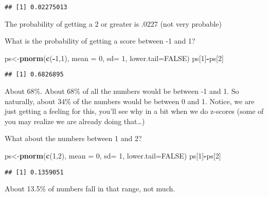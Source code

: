 \documentclass[
]{book}
\newenvironment{Shaded}{\begin{snugshade}}{\end{snugshade}}
\newcommand{\AttributeTok}[1]{\textcolor[rgb]{0.13,0.29,0.53}{#1}}
\newcommand{\ConstantTok}[1]{\textcolor[rgb]{0.56,0.35,0.01}{#1}}
\newcommand{\DecValTok}[1]{\textcolor[rgb]{0.00,0.00,0.81}{#1}}
\newcommand{\FunctionTok}[1]{\textcolor[rgb]{0.13,0.29,0.53}{\textbf{#1}}}
\newcommand{\NormalTok}[1]{#1}
\newcommand{\OtherTok}[1]{\textcolor[rgb]{0.56,0.35,0.01}{#1}}
\newcommand{\SpecialCharTok}[1]{\textcolor[rgb]{0.81,0.36,0.00}{\textbf{#1}}}
\begin{document}
\begin{verbatim}
## [1] 0.02275013
\end{verbatim}

The probability of getting a 2 or greater is .0227 (not very probable)

What is the probability of getting a score between -1 and 1?

\begin{Shaded}
\begin{Highlighting}[]
\NormalTok{ps}\OtherTok{\textless{}{-}}\FunctionTok{pnorm}\NormalTok{(}\FunctionTok{c}\NormalTok{(}\SpecialCharTok{{-}}\DecValTok{1}\NormalTok{,}\DecValTok{1}\NormalTok{), }\AttributeTok{mean =} \DecValTok{0}\NormalTok{, }\AttributeTok{sd=} \DecValTok{1}\NormalTok{, }\AttributeTok{lower.tail=}\ConstantTok{FALSE}\NormalTok{)}
\NormalTok{ps[}\DecValTok{1}\NormalTok{]}\SpecialCharTok{{-}}\NormalTok{ps[}\DecValTok{2}\NormalTok{]}
\end{Highlighting}
\end{Shaded}

\begin{verbatim}
## [1] 0.6826895
\end{verbatim}

About 68\%. About 68\% of all the numbers would be between -1 and 1. So
naturally, about 34\% of the numbers would be between 0 and 1. Notice, we
are just getting a feeling for this, you'll see why in a bit when we do
z-scores (some of you may realize we are already doing that\ldots)

What about the numbers between 1 and 2?

\begin{Shaded}
\begin{Highlighting}[]
\NormalTok{ps}\OtherTok{\textless{}{-}}\FunctionTok{pnorm}\NormalTok{(}\FunctionTok{c}\NormalTok{(}\DecValTok{1}\NormalTok{,}\DecValTok{2}\NormalTok{), }\AttributeTok{mean =} \DecValTok{0}\NormalTok{, }\AttributeTok{sd=} \DecValTok{1}\NormalTok{, }\AttributeTok{lower.tail=}\ConstantTok{FALSE}\NormalTok{)}
\NormalTok{ps[}\DecValTok{1}\NormalTok{]}\SpecialCharTok{{-}}\NormalTok{ps[}\DecValTok{2}\NormalTok{]}
\end{Highlighting}
\end{Shaded}

\begin{verbatim}
## [1] 0.1359051
\end{verbatim}

About 13.5\% of numbers fall in that range, not much.
\end{document}
